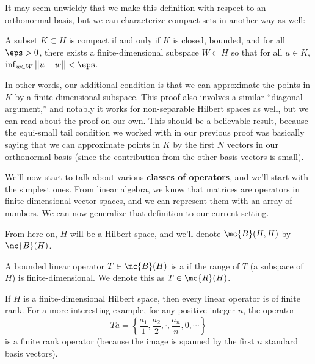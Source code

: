 It may seem unwieldy that we make this definition with respect to an orthonormal basis, but we can characterize compact sets in another way as well:

\begin{theorem}
A subset $K \subset H$ is compact if and only if $K$ is closed, bounded, and for all $\eps > 0$, there exists a finite-dimensional subspace $W \subset H$ so that for all $u \in K$, $\inf_{w \in W} ||u - w|| < \eps$.
\end{theorem}

In other words, our additional condition is that we can approximate the points in $K$ by a finite-dimensional subspace. This proof also involves a similar ``diagonal argument,'' and notably it works for non-separable Hilbert spaces as well, but we can read about the proof on our own. This should be a believable result, because the equi-small tail condition we worked with in our previous proof was basically saying that we can approximate points in $K$ by the first $N$ vectors in our orthonormal basis (since the contribution from the other basis vectors is small).

We'll now start to talk about various \textbf{classes of operators}, and we'll start with the simplest ones. From linear algebra, we know that matrices are operators in finite-dimensional vector spaces, and we can represent them with an array of numbers. We can now generalize that definition to our current setting.

\begin{fact}
From here on, $H$ will be a Hilbert space, and we'll denote $\mc{B}(H, H)$ by $\mc{B}(H)$. 
\end{fact}

\begin{definition}
A bounded linear operator $T \in \mc{B}(H)$ is a  if the range of $T$ (a subspace of $H$) is finite-dimensional. We denote this as $T \in \mc{R}(H)$.
\end{definition}

\begin{example}
If $H$ is a finite-dimensional Hilbert space, then every linear operator is of finite rank. For a more interesting example, for any positive integer $n$, the operator
\[
    Ta = \left\{\frac{a_1}{1}, \frac{a_2}{2}, \cdot, \frac{a_n}{n}, 0, \cdots\right\}
\]  
is a finite rank operator (because the image is spanned by the first $n$ standard basis vectors). 
\end{example}

